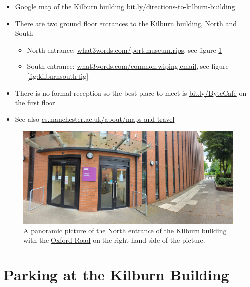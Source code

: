 \documentclass[
  12pt,
]{book}
\providecommand{\tightlist}{%
  \setlength{\itemsep}{0pt}\setlength{\parskip}{0pt}}
\begin{document}
\begin{itemize}
\tightlist
\item
  Google map of the Kilburn building \href{http://bit.ly/directions-to-kilburn-building}{bit.ly/directions-to-kilburn-building}
\item
  There are two ground floor entrances to the Kilburn building, North and South

  \begin{itemize}
  \tightlist
  \item
    North entrance: \href{https://what3words.com/port.museum.rips}{what3words.com/port.museum.rips}, see figure \ref{fig:kilburnnorth-fig}
  \item
    South entrance: \href{https://what3words.com/common.wiping.email}{what3words.com/common.wiping.email}, see figure \ref{fig:kilburnsouth-fig}
  \end{itemize}
\item
  There is no formal reception so the best place to meet is \href{http://bit.ly/ByteCafe}{bit.ly/ByteCafe} on the first floor
\item
  See also \href{https://www.cs.manchester.ac.uk/about/maps-and-travel/}{cs.manchester.ac.uk/about/maps-and-travel}
\end{itemize}

\begin{figure}

{\centering \includegraphics[width=1\linewidth]{images/kilburn-north-entrance} 

}

\caption{A panoramic picture of the North entrance of the \href{https://en.wikipedia.org/wiki/Kilburn_Building}{Kilburn building} with the \href{https://en.wikipedia.org/wiki/Wilmslow_Road}{Oxford Road} on the right hand side of the picture.}\label{fig:kilburnnorth-fig}
\end{figure}



\hypertarget{parking}{%
\section{Parking at the Kilburn Building}\label{parking}}
\end{document}
